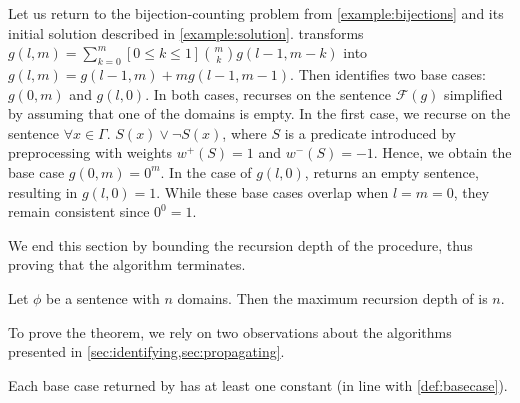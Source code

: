 \documentclass[a4paper,UKenglish,cleveref, autoref, thm-restate]{lipics-v2021}
\begin{document}
\begin{example}\label{example:bijectionstwo}
  Let us return to the bijection-counting problem from \cref{example:bijections}
  and its initial solution described in \cref{example:solution}. \Simplify
  transforms $g(l, m) = \sum_{k=0}^{m}[0 \le k \le 1]\binom{m}{k}g(l-1, m-k)$
  into $g(l, m) = g(l-1, m) + mg(l-1, m-1)$. Then \FindBaseCases identifies two
  base cases: $g(0, m)$ and $g(l, 0)$. In both cases, \CompileWithBaseCases
  recurses on the sentence $\mathcal{F}(g)$ simplified by assuming that one of
  the domains is empty. In the first case, we recurse on the sentence
  $\forall x \in \Gamma\text{. }S(x) \lor \neg S(x)$, where $S$ is a predicate
  introduced by preprocessing with weights $w^{+}(S) = 1$ and $w^{-}(S) = -1$.
  Hence, we obtain the base case $g(0, m) = 0^{m}$. In the case of $g(l, 0)$,
   returns an empty sentence, resulting in
  $g(l, 0) = 1$. While these base cases overlap when $l = m = 0$, they remain
  consistent since $0^{0} = 1$.
\end{example}



We end this section by bounding the recursion depth of the \CompileWithBaseCases
procedure, thus proving that the algorithm terminates.

\begin{theorem}
  Let $\phi$ be a sentence with $n$ domains. Then the maximum recursion depth of
  \CompileWithBaseCases{$\phi$} is $n$.
\end{theorem}

To prove the theorem, we rely on two observations about the algorithms presented
in \cref{sec:identifying,sec:propagating}.

\begin{observation}\label{observation1}
  Each base case returned by \FindBaseCases has at least one constant (in line
  with \cref{def:basecase}).
\end{observation}
\end{document}
